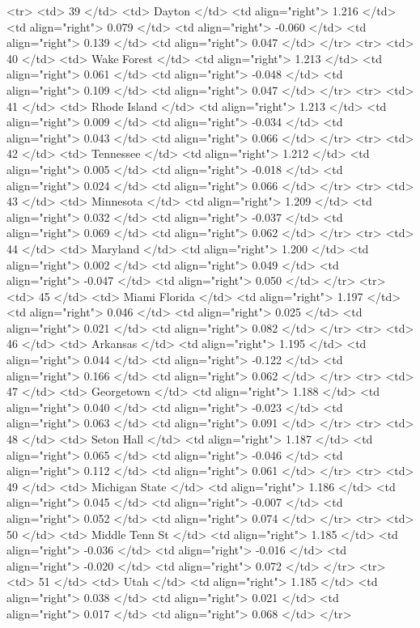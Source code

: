   <tr> <td> 39 </td> <td> Dayton </td> <td align="right"> 1.216 </td> <td align="right"> 0.079 </td> <td align="right"> -0.060 </td> <td align="right"> 0.139 </td> <td align="right"> 0.047 </td> </tr>
  <tr> <td> 40 </td> <td> Wake Forest </td> <td align="right"> 1.213 </td> <td align="right"> 0.061 </td> <td align="right"> -0.048 </td> <td align="right"> 0.109 </td> <td align="right"> 0.047 </td> </tr>
  <tr> <td> 41 </td> <td> Rhode Island </td> <td align="right"> 1.213 </td> <td align="right"> 0.009 </td> <td align="right"> -0.034 </td> <td align="right"> 0.043 </td> <td align="right"> 0.066 </td> </tr>
  <tr> <td> 42 </td> <td> Tennessee </td> <td align="right"> 1.212 </td> <td align="right"> 0.005 </td> <td align="right"> -0.018 </td> <td align="right"> 0.024 </td> <td align="right"> 0.066 </td> </tr>
  <tr> <td> 43 </td> <td> Minnesota </td> <td align="right"> 1.209 </td> <td align="right"> 0.032 </td> <td align="right"> -0.037 </td> <td align="right"> 0.069 </td> <td align="right"> 0.062 </td> </tr>
  <tr> <td> 44 </td> <td> Maryland </td> <td align="right"> 1.200 </td> <td align="right"> 0.002 </td> <td align="right"> 0.049 </td> <td align="right"> -0.047 </td> <td align="right"> 0.050 </td> </tr>
  <tr> <td> 45 </td> <td> Miami Florida </td> <td align="right"> 1.197 </td> <td align="right"> 0.046 </td> <td align="right"> 0.025 </td> <td align="right"> 0.021 </td> <td align="right"> 0.082 </td> </tr>
  <tr> <td> 46 </td> <td> Arkansas </td> <td align="right"> 1.195 </td> <td align="right"> 0.044 </td> <td align="right"> -0.122 </td> <td align="right"> 0.166 </td> <td align="right"> 0.062 </td> </tr>
  <tr> <td> 47 </td> <td> Georgetown </td> <td align="right"> 1.188 </td> <td align="right"> 0.040 </td> <td align="right"> -0.023 </td> <td align="right"> 0.063 </td> <td align="right"> 0.091 </td> </tr>
  <tr> <td> 48 </td> <td> Seton Hall </td> <td align="right"> 1.187 </td> <td align="right"> 0.065 </td> <td align="right"> -0.046 </td> <td align="right"> 0.112 </td> <td align="right"> 0.061 </td> </tr>
  <tr> <td> 49 </td> <td> Michigan State </td> <td align="right"> 1.186 </td> <td align="right"> 0.045 </td> <td align="right"> -0.007 </td> <td align="right"> 0.052 </td> <td align="right"> 0.074 </td> </tr>
  <tr> <td> 50 </td> <td> Middle Tenn St </td> <td align="right"> 1.185 </td> <td align="right"> -0.036 </td> <td align="right"> -0.016 </td> <td align="right"> -0.020 </td> <td align="right"> 0.072 </td> </tr>
  <tr> <td> 51 </td> <td> Utah </td> <td align="right"> 1.185 </td> <td align="right"> 0.038 </td> <td align="right"> 0.021 </td> <td align="right"> 0.017 </td> <td align="right"> 0.068 </td> </tr>
